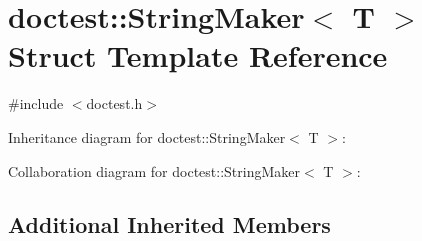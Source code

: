 \hypertarget{structdoctest_1_1_string_maker}{}\section{doctest\+:\+:String\+Maker$<$ T $>$ Struct Template Reference}
\label{structdoctest_1_1_string_maker}


{\ttfamily \#include $<$doctest.\+h$>$}



Inheritance diagram for doctest\+:\+:String\+Maker$<$ T $>$\+:


Collaboration diagram for doctest\+:\+:String\+Maker$<$ T $>$\+:
\subsection*{Additional Inherited Members}
